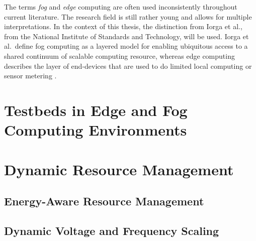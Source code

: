 The terms \emph{fog} and \emph{edge} computing are often used inconsistently
throughout current literature. The research field is still rather young and
allows for multiple interpretations. In the context of this thesis, the
distinction from Iorga et al., from the National Institute of Standards and
Technology, will be used. Iorga et al.\ define fog computing as a layered model
for enabling ubiquitous access to a shared continuum of scalable computing
resource, whereas edge computing describes the layer of end-devices that are
used to do limited local computing or sensor metering \cite{iorga2018}.

\section{Testbeds in Edge and Fog Computing Environments}
\label{sec:testbeds_in_edge_and_fog_computing_environments}

\section{Dynamic Resource Management}
\label{sec:dynamic_resource_management}

\subsection{Energy-Aware Resource Management}
\label{sec:energy-aware_resource_management}

\subsection{Dynamic Voltage and Frequency Scaling}
\label{sec:dynamic_voltage_and_frequency_scaling}

